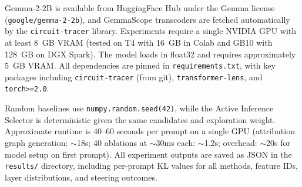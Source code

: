 Gemma-2-2B is available from HuggingFace Hub under the Gemma license
(\texttt{google/\allowbreak gemma-2-2b}),
and GemmaScope transcoders are fetched automatically by the \texttt{circuit-tracer} library.
Experiments require a single NVIDIA GPU with at least 8~GB VRAM (tested on T4 with 16~GB in Colab
and GB10 with 128~GB on DGX Spark). The model loads in float32 and requires approximately 5~GB VRAM.
All dependencies are pinned in \texttt{requirements.txt}, with key packages including \texttt{circuit-tracer}
(from git), \texttt{transformer-lens}, and \texttt{torch>=2.0}.

Random baselines use \texttt{numpy.random.seed(42)}, while the Active Inference Selector is
deterministic given the same candidates and exploration weight.
Approximate runtime is 40--60 seconds per prompt on a single GPU (attribution graph generation: $\sim$18s;
40 ablations at $\sim$30ms each: $\sim$1.2s; overhead: $\sim$20s for model setup on first prompt).
All experiment outputs are saved as JSON in the \texttt{results/} directory, including per-prompt KL values
for all methods, feature IDs, layer distributions, and steering outcomes.
